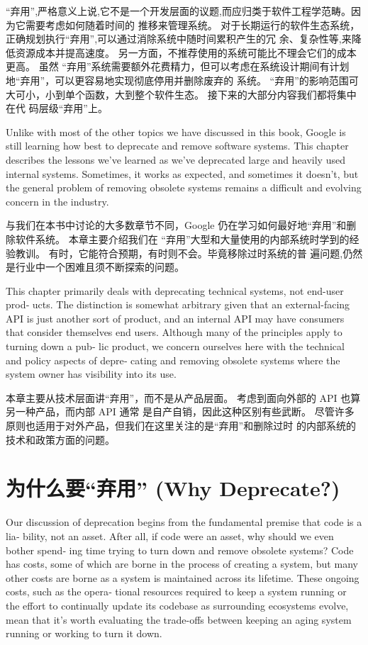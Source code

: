 \documentclass[10pt,a4paper,UTF8]{ctexart}
\begin{document}
“弃用”,严格意义上说,它不是一个开发层面的议题,而应归类于软件工程学范畴。因为它需要考虑如何随着时间的
推移来管理系统。 对于长期运行的软件生态系统，正确规划执行“弃用”,可以通过消除系统中随时间累积产生的冗
余、复杂性等,来降低资源成本并提高速度。 另一方面，不推荐使用的系统可能比不理会它们的成本更高。 虽然
“弃用”系统需要额外花费精力，但可以考虑在系统设计期间有计划地“弃用”，可以更容易地实现彻底停用并删除废弃的
系统。 “弃用”的影响范围可大可小，小到单个函数，大到整个软件生态。 接下来的大部分内容我们都将集中在代
码层级“弃用”上。


Unlike with most of the other topics we have discussed in this book, Google is still learning how
best to deprecate and remove software systems. This chapter describes the lessons we’ve learned as
we’ve deprecated large and heavily used internal systems. Sometimes, it works as expected, and
sometimes it doesn’t, but the general problem of removing obsolete systems remains a difficult and
evolving concern in the industry.

与我们在本书中讨论的大多数章节不同，Google 仍在学习如何最好地“弃用”和删除软件系统。 本章主要介绍我们在
“弃用”大型和大量使用的内部系统时学到的经验教训。 有时，它能符合预期，有时则不会。毕竟移除过时系统的普
遍问题,仍然是行业中一个困难且须不断探索的问题。

This chapter primarily deals with deprecating technical systems, not end-user prod‐ ucts. The
distinction is somewhat arbitrary given that an external-facing API is just another sort of product,
and an internal API may have consumers that consider themselves end users. Although many of the
principles apply to turning down a pub‐ lic product, we concern ourselves here with the technical
and policy aspects of depre‐ cating and removing obsolete systems where the system owner has
visibility into its use.

本章主要从技术层面讲“弃用”，而不是从产品层面。 考虑到面向外部的 API 也算另一种产品，而内部 API 通常
是自产自销，因此这种区别有些武断。 尽管许多原则也适用于对外产品，但我们在这里关注的是“弃用”和删除过时
的内部系统的技术和政策方面的问题。

\section{为什么要“弃用” (Why Deprecate?)}
\label{sec:orgdf2b529}

Our discussion of deprecation begins from the fundamental premise that code is a lia‐ bility, not an
asset. After all, if code were an asset, why should we even bother spend‐ ing time trying to turn
down and remove obsolete systems? Code has costs, some of which are borne in the process of creating
a system, but many other costs are borne as a system is maintained across its lifetime. These
ongoing costs, such as the opera‐ tional resources required to keep a system running or the effort
to continually update its codebase as surrounding ecosystems evolve, mean that it’s worth evaluating
the trade-offs between keeping an aging system running or working to turn it down.
\end{document}
